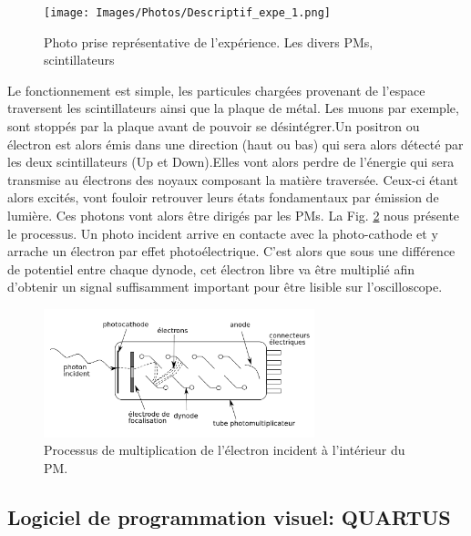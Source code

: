 \documentclass[12pt]{article}
\begin{document}
\begin{figure}[htpb!]
    \centering
    \texttt{[image: Images/Photos/Descriptif\_expe\_1.png]}
    \caption{Photo prise représentative de l'expérience. Les divers PMs, scintillateurs }
    \label{fig:Experience_1_situation}
\end{figure}

Le fonctionnement est simple, les particules chargées provenant de l'espace traversent les scintillateurs ainsi que la plaque de métal. Les muons par exemple, sont stoppés par la plaque avant de pouvoir se désintégrer.Un positron ou électron est alors émis dans une direction (haut ou bas) qui sera alors détecté par les deux scintillateurs (Up et Down).Elles vont alors perdre de l'énergie qui sera transmise au électrons des noyaux composant la matière traversée. Ceux-ci étant alors excités, vont fouloir retrouver leurs états fondamentaux par émission de lumière. Ces photons vont alors être dirigés par les PMs. La Fig. \ref{fig:PM} nous présente le processus. Un photo incident arrive en contacte avec la photo-cathode et y arrache un électron par effet photoélectrique. C'est alors que sous une différence de potentiel entre chaque dynode, cet électron libre va être multiplié afin d'obtenir un signal suffisamment important pour être lisible sur l'oscilloscope.

\begin{figure}[htpb!]
    \centering
    \includegraphics[width=0.7\textwidth]{Images/Photos/PM.png}
    \captionsetup{width=0.9\textwidth}
    \caption{Processus de multiplication de l'électron incident à l'intérieur du PM.}
    \label{fig:PM}
\end{figure}

\newpage
\subsection{Logiciel de programmation visuel: QUARTUS}
\end{document}
